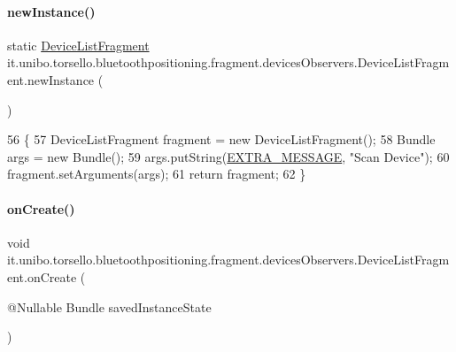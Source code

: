 \paragraph{\texorpdfstring{new\+Instance()}{newInstance()}}
{\footnotesize\ttfamily static \hyperlink{classit_1_1unibo_1_1torsello_1_1bluetoothpositioning_1_1fragment_1_1devicesObservers_1_1DeviceListFragment}{Device\+List\+Fragment} it.\+unibo.\+torsello.\+bluetoothpositioning.\+fragment.\+devices\+Observers.\+Device\+List\+Fragment.\+new\+Instance (\begin{DoxyParamCaption}{ }\end{DoxyParamCaption})\hspace{0.3cm}{\ttfamily [static]}}


\begin{DoxyCode}
56                                                    \{
57         DeviceListFragment fragment = \textcolor{keyword}{new} DeviceListFragment();
58         Bundle args = \textcolor{keyword}{new} Bundle();
59         args.putString(\hyperlink{classit_1_1unibo_1_1torsello_1_1bluetoothpositioning_1_1fragment_1_1devicesObservers_1_1DeviceListFragment_a6ba928c98442b32c8a32eb35b7cecf45_a6ba928c98442b32c8a32eb35b7cecf45}{EXTRA\_MESSAGE}, \textcolor{stringliteral}{"Scan Device"});
60         fragment.setArguments(args);
61         \textcolor{keywordflow}{return} fragment;
62     \}
\end{DoxyCode}
\hypertarget{classit_1_1unibo_1_1torsello_1_1bluetoothpositioning_1_1fragment_1_1devicesObservers_1_1DeviceListFragment_a5e548142d1a24ac89205c9e2adac82b6_a5e548142d1a24ac89205c9e2adac82b6}{}\label{classit_1_1unibo_1_1torsello_1_1bluetoothpositioning_1_1fragment_1_1devicesObservers_1_1DeviceListFragment_a5e548142d1a24ac89205c9e2adac82b6_a5e548142d1a24ac89205c9e2adac82b6} 
\paragraph{\texorpdfstring{on\+Create()}{onCreate()}}
{\footnotesize\ttfamily void it.\+unibo.\+torsello.\+bluetoothpositioning.\+fragment.\+devices\+Observers.\+Device\+List\+Fragment.\+on\+Create (\begin{DoxyParamCaption}\item[{@Nullable Bundle}]{saved\+Instance\+State }\end{DoxyParamCaption})}


